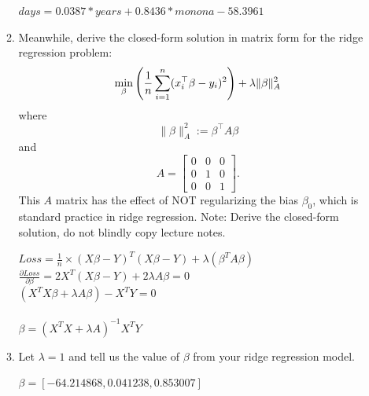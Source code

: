 \documentclass[a4paper]{article}
\theoremstyle{definition}
\newenvironment{soln}{
    \leavevmode\color{blue}\ignorespaces
}{}
\begin{document}
\begin{enumerate}
\begin{enumerate}
\begin{soln}
$days = 0.0387 * years + 0.8436 * monona -58.3961$
\end{soln}
\item
Meanwhile, derive the closed-form solution in matrix form for the ridge regression problem:
$$\min_\beta \left({1\over n} \sum_{i=1}^n (x_i^\top \beta - y_i)^2 \right) + \lambda \|\beta\|_A^2$$
where 
$$\|\beta\|_A^2 := \beta^\top A \beta$$
and
$$A=
\begin{bmatrix}
0 & 0 & 0 \\
0 & 1 & 0 \\
0 & 0 & 1
\end{bmatrix}.$$
This $A$ matrix has the effect of NOT regularizing the bias $\beta_0$, which is standard practice in ridge regression.
Note: Derive the closed-form solution, do not blindly copy lecture notes.

\begin{soln}
$Loss = \frac{1}{n} \times(X\beta - Y)^T(X\beta - Y) + \lambda (\beta^T A \beta) $\\
$\frac{\partial Loss}{\partial \beta} = 2X^T(X\beta - Y)+2 \lambda A\beta = 0$\\
$(X^TX\beta +\lambda A \beta) - X^TY = 0$\\\\
$ \beta = (X^TX +\lambda A)^{-1}X^TY$
\end{soln}
\item
Let $\lambda=1$ and tell us the value of $\beta$ from your ridge regression model.

\begin{soln}
$\beta = [-64.214868, 0.041238, 0.853007]$
\end{soln}

\end{enumerate}

\end{enumerate}
\end{document}
